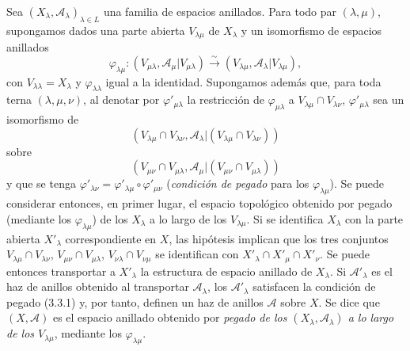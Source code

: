 \begin{env}[4.1.7]
\label{0.4.1.7-fr}
Sea $(X_\lambda,\mathcal{A}_\lambda)_{\lambda\in L}$ una familia de espacios
anillados. Para todo par $(\lambda,\mu)$, supongamos dados una parte abierta
$V_{\lambda\mu}$ de $X_\lambda$ y un isomorfismo de espacios anillados
\[
  \varphi_{\lambda\mu}:
  (V_{\mu\lambda},\mathcal{A}_\mu|V_{\mu\lambda})
  \xrightarrow{\sim}
  (V_{\lambda\mu},\mathcal{A}_\lambda|V_{\lambda\mu}),
\]
con $V_{\lambda\lambda}=X_\lambda$ y $\varphi_{\lambda\lambda}$ igual a la
identidad. Supongamos además que, para toda terna $(\lambda,\mu,\nu)$, al
denotar por $\varphi'_{\mu\lambda}$ la restricción de
$\varphi_{\mu\lambda}$ a $V_{\lambda\mu}\cap V_{\lambda\nu}$,
$\varphi'_{\mu\lambda}$ sea un isomorfismo de
\[
  (V_{\lambda\mu}\cap V_{\lambda\nu},
   \mathcal{A}_\lambda|(V_{\lambda\mu}\cap V_{\lambda\nu}))
\]
sobre
\[
  (V_{\mu\nu}\cap V_{\mu\lambda},
   \mathcal{A}_\mu|(V_{\mu\nu}\cap V_{\mu\lambda}))
\]
y que se tenga
$\varphi'_{\lambda\nu}=\varphi'_{\lambda\mu}\circ\varphi'_{\mu\nu}$
(\emph{condición de pegado} para los $\varphi_{\lambda\mu}$). Se puede
considerar entonces, en primer lugar, el espacio topológico obtenido por
pegado (mediante los $\varphi_{\lambda\mu}$) de los $X_\lambda$
a lo largo de los $V_{\lambda\mu}$. Si se identifica $X_\lambda$ con la parte
abierta $X'_\lambda$ correspondiente en $X$, las hipótesis implican que los
tres conjuntos $V_{\lambda\mu}\cap V_{\lambda\nu}$,
$V_{\mu\nu}\cap V_{\mu\lambda}$,
$V_{\nu\lambda}\cap V_{\nu\mu}$ se identifican con
$X'_\lambda\cap X'_\mu\cap X'_\nu$. Se puede entonces transportar a
$X'_\lambda$ la estructura de espacio anillado de $X_\lambda$. Si
$\mathcal{A}'_\lambda$ es el haz de anillos obtenido al transportar
$\mathcal{A}_\lambda$, los $\mathcal{A}'_\lambda$ satisfacen la condición de
pegado (3.3.1) y, por tanto, definen un haz de anillos $\mathcal{A}$ sobre
$X$. Se dice que $(X,\mathcal{A})$ es el espacio anillado obtenido por
\emph{pegado de los $(X_\lambda,\mathcal{A}_\lambda)$ a lo largo de los
$V_{\lambda\mu}$}, mediante los $\varphi_{\lambda\mu}$.
\end{env}
